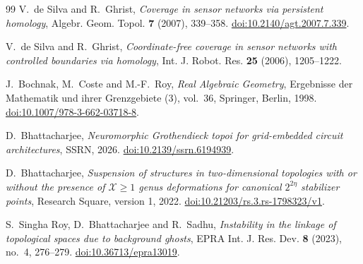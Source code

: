 \begin{thebibliography}{99}
V.~de Silva and R.~Ghrist,
\emph{Coverage in sensor networks via persistent homology},
Algebr. Geom. Topol. \textbf{7} (2007), 339--358.
\href{https://doi.org/10.2140/agt.2007.7.339}{doi:10.2140/agt.2007.7.339}.

V.~de Silva and R.~Ghrist,
\emph{Coordinate-free coverage in sensor networks with controlled boundaries via homology},
Int. J. Robot. Res. \textbf{25} (2006), 1205--1222.

J.~Bochnak, M.~Coste and M.-F.~Roy,
\emph{Real Algebraic Geometry},
Ergebnisse der Mathematik und ihrer Grenzgebiete (3), vol.~36, Springer, Berlin, 1998.
\href{https://doi.org/10.1007/978-3-662-03718-8}{doi:10.1007/978-3-662-03718-8}.

D.~Bhattacharjee,
\emph{Neuromorphic Grothendieck topoi for grid-embedded circuit architectures},
SSRN, 2026.
\href{https://doi.org/10.2139/ssrn.6194939}{doi:10.2139/ssrn.6194939}.

D.~Bhattacharjee,
\emph{Suspension of structures in two-dimensional topologies with or without the presence of $\mathcal X\ge1$ genus deformations for canonical $2^{2\eta}$ stabilizer points},
Research Square, version 1, 2022.
\href{https://doi.org/10.21203/rs.3.rs-1798323/v1}{doi:10.21203/rs.3.rs-1798323/v1}.

S.~Singha Roy, D.~Bhattacharjee and R.~Sadhu,
\emph{Instability in the linkage of topological spaces due to background ghosts},
EPRA Int. J. Res. Dev. \textbf{8} (2023), no.~4, 276--279.
\href{https://doi.org/10.36713/epra13019}{doi:10.36713/epra13019}.
\end{thebibliography}
